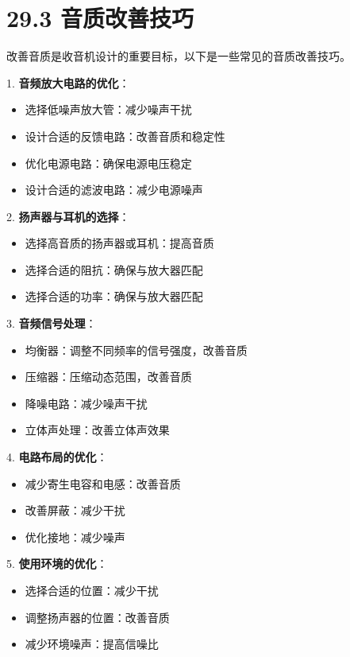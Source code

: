 \documentclass[12pt,UTF8]{ctexbook}
\begin{document}
\section*{29.3 音质改善技巧}

改善音质是收音机设计的重要目标，以下是一些常见的音质改善技巧。

1. \textbf{音频放大电路的优化}：
   \begin{itemize}[leftmargin=3.5em]
   \item 选择低噪声放大管：减少噪声干扰
   \item 设计合适的反馈电路：改善音质和稳定性
   \item 优化电源电路：确保电源电压稳定
   \item 设计合适的滤波电路：减少电源噪声
   \end{itemize}

2. \textbf{扬声器与耳机的选择}：
   \begin{itemize}[leftmargin=3.5em]
   \item 选择高音质的扬声器或耳机：提高音质
   \item 选择合适的阻抗：确保与放大器匹配
   \item 选择合适的功率：确保与放大器匹配
   \end{itemize}

3. \textbf{音频信号处理}：
   \begin{itemize}[leftmargin=3.5em]
   \item 均衡器：调整不同频率的信号强度，改善音质
   \item 压缩器：压缩动态范围，改善音质
   \item 降噪电路：减少噪声干扰
   \item 立体声处理：改善立体声效果
   \end{itemize}

4. \textbf{电路布局的优化}：
   \begin{itemize}[leftmargin=3.5em]
   \item 减少寄生电容和电感：改善音质
   \item 改善屏蔽：减少干扰
   \item 优化接地：减少噪声
   \end{itemize}

5. \textbf{使用环境的优化}：
   \begin{itemize}[leftmargin=3.5em]
   \item 选择合适的位置：减少干扰
   \item 调整扬声器的位置：改善音质
   \item 减少环境噪声：提高信噪比
   \end{itemize}
\end{document}
